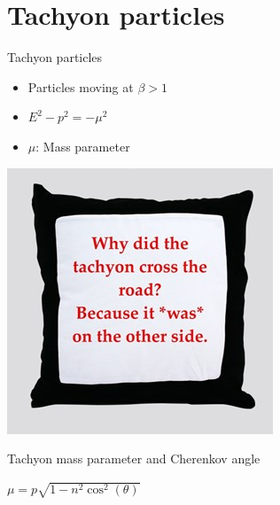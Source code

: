 \documentclass{beamer}
\begin{document}
\section{Tachyon particles}
\begin{frame}{Tachyon particles}
  \begin{minipage}{0.5\linewidth}
    \begin{itemize}
      \setlength\itemsep{2.0em}
      \item{Particles moving at $\beta > 1$}
      \item{$E^2 - p^2 = -\mu^2$}
      \item{$\mu$: Mass parameter}
    \end{itemize}
  \end{minipage}
  \begin{minipage}{0.4\linewidth}
    \centering
    \includegraphics[width = 0.9\linewidth]{TachyonJoke.jpg}
  \end{minipage}
  \begin{block}{Tachyon mass parameter and Cherenkov angle}
    \begin{center}
      \vspace{0.3cm}
      $\mu = p\sqrt{1 - n^2\cos^2(\theta)}$
      \vspace{0.3cm}
    \end{center}
  \end{block}
\end{frame}
\end{document}
